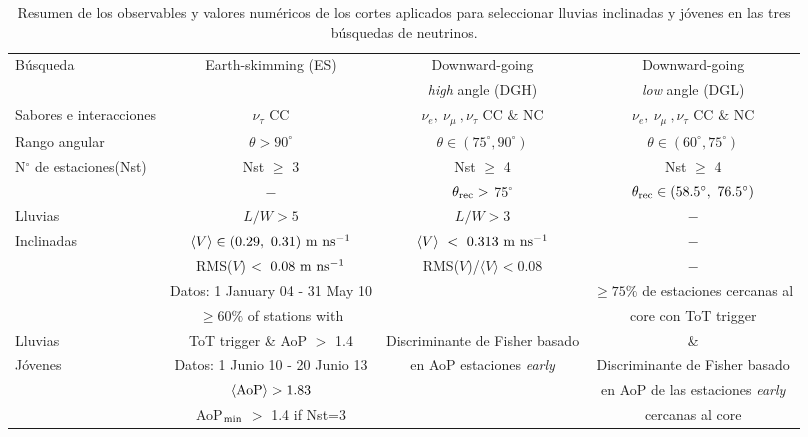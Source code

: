 	\begin{table}
	\begin{center}
		\renewcommand{\arraystretch}{1.4}
		\footnotesize
		\begin{tabular}{l|c|c|c}
		\hline
		Búsqueda & Earth-skimming (ES)           & Downward-going                        & Downward-going                       \\
				&                               & {\it high} angle (DGH)                & {\it low} angle (DGL)                \\
		\hline 
		Sabores e interacciones & $\nu_\tau$ CC & $\nu_e,~\nu_\mu~,\nu_\tau$ CC $\&$ NC &  $\nu_e,~\nu_\mu~,\nu_\tau$ CC $\&$ NC \\

		Rango angular & $\theta>90^\circ$             & $\theta \in (75^\circ, 90^\circ)$ & $\theta \in (60^\circ, 75^\circ)$ \\

		N$^\circ$ de estaciones(Nst) & Nst $\geq$ 3   & Nst $\geq$ 4 & Nst $\geq$ 4 \\
		\hline 
					& $-$                             & $\theta_{\rm rec}>$ 75$^{\circ}$   &   $\theta_{\rm rec}\in (58.5^\circ,~76.5^{\circ})$\\
		Lluvias    & $L/W > 5$                                         & $L/W > 3$ & $-$ \\
		Inclinadas & $\langle V\rangle\in (0.29,~0.31)~{\rm m~ns^{-1}}$ & $\langle V \rangle~<~0.313~{\rm m~ns^{-1}}$ & $-$ \\
				& RMS($V$)$~<~0.08~{\rm m~ns^{-1}}$                 & RMS($V$)/$\langle V\rangle<0.08$ & $-$ \\
		\hline 
				& Datos: 1 January 04 - 31 May 10 &                                     & $\geq 75\%$ de estaciones cercanas al   \\
				& $\geq 60\%$ of stations with  &                                      & core con ToT trigger       \\
		Lluvias     & ToT trigger \& AoP $>$ 1.4    & Discriminante de Fisher basado &                          \&        \\
		Jóvenes   & Datos: 1 Junio 10 - 20 Junio 13   & en AoP estaciones {\it early}   & Discriminante de Fisher basado  \\
				& $\langle {\rm AoP} \rangle> 1.83$  &                                 & en AoP de las estaciones {\it early} \\
				& AoP$_{\rm min}$ $>$ 1.4 if Nst=3   &                                 & cercanas al core \\
		\hline
		\end{tabular}
		\vskip -3mm
		\caption{Resumen de los observables y valores numéricos de los cortes aplicados para seleccionar lluvias inclinadas y jóvenes en las tres búsquedas de neutrinos.} 
	\end{center}

	\label{tab:cuts}
	\end{table}